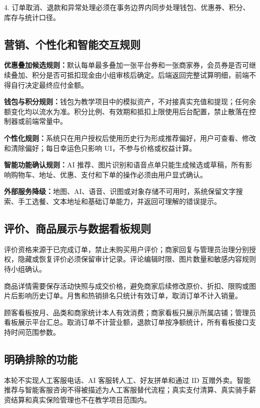 4. 订单取消、退款和异常处理必须在事务边界内同步处理钱包、优惠券、积分、库存与统计口径。

\subsection{营销、个性化和智能交互规则}

\textbf{优惠叠加候选规则：}默认每单最多叠加一张平台券和一张商家券，会员券是否可继续叠加、积分是否可抵扣现金由小组审核后确定。后端返回完整试算明细，前端不得自行决定最终应付金额。

\textbf{钱包与积分规则：}钱包为教学项目中的模拟资产，不对接真实充值和提现；任何余额变化均以流水为准。积分比例、有效期和抵扣上限使用后台配置，禁止散落在控制器或前端常量中。

\textbf{个性化规则：}系统只在用户授权后使用历史行为形成推荐偏好，用户可查看、修改和清除偏好；每日幸运色只影响 UI，不参与价格或权益计算。

\textbf{智能功能确认规则：}AI 推荐、图片识别和语音点单只能生成候选或草稿，所有影响购物车、地址、优惠、支付和下单的操作必须由用户显式确认。

\textbf{外部服务降级：}地图、AI、语音、识图或对象存储不可用时，系统保留文字搜索、手工选餐、文本地址和基础订单能力，并返回可理解的错误提示。

\subsection{评价、商品展示与数据看板规则}

评价资格来源于已完成订单，禁止未购买用户评价；商家回复与管理员治理分别授权，隐藏或恢复评价必须保留审计记录。评论编辑时限、图片数量和敏感内容规则待小组确认。

商品详情需要保存活动快照与成交价格，避免商家后续修改原价、折扣、限购或图片后影响历史订单。月售和热销排名只统计有效订单，取消订单不计入销量。

顾客看板按月、品类和商家统计本人有效消费；商家看板只展示所属店铺；管理员看板展示平台汇总。取消订单不计营业额，退款订单按净额统计，所有看板接口支持时间范围参数。

\subsection{明确排除的功能}

本轮不实现人工客服电话、AI 客服转人工、好友拼单和通过 ID 互赠外卖。智能推荐与智能客服咨询不得被描述为人工客服替代流程；真实支付清算、真实骑手薪资结算和真实保险管理也不在教学项目范围内。

\endgroup
